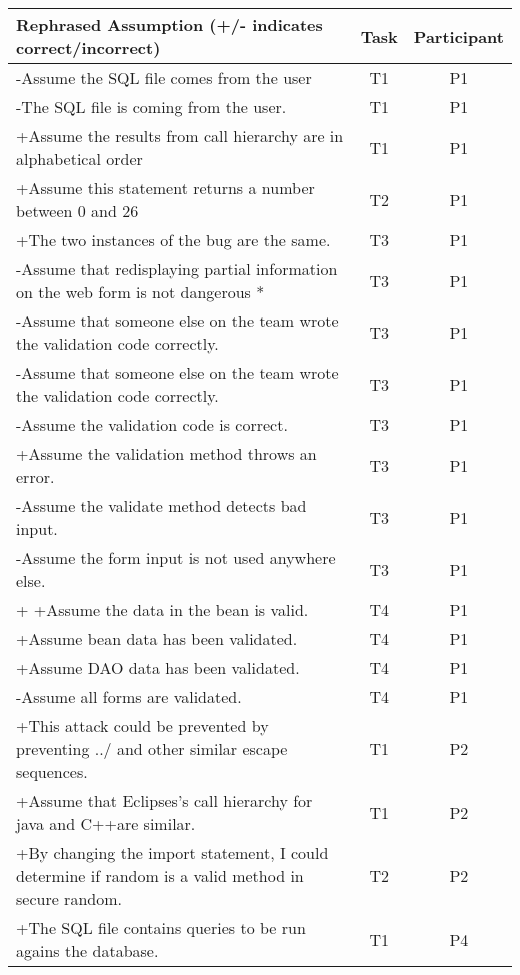 \documentclass[10pt,journal,compsoc]{IEEEtran}
\begin{document}
\begin{table*}
	\centering
	\begin{tabularx}{\textwidth}{|X|c|c|}
		\hline
		Rephrased Assumption (+/- indicates correct/incorrect)	&	Task	&	Participant	\\
		\hline
		-Assume the SQL file comes from the user	&	T1	&	P1	\\
		-The SQL file is coming from the user.	&	T1	&	P1	\\
		+Assume the results from call hierarchy are in alphabetical order	&	T1	&	P1	\\
		+Assume this statement returns a number between 0 and 26 	&	T2	&	P1	\\
		+The two instances of the bug are the same.	&	T3	&	P1	\\
		-Assume that redisplaying partial information on the web form is not dangerous *	&	T3	&	P1	\\
		-Assume that someone else on the team wrote the validation code correctly.	&	T3	&	P1	\\
		-Assume that someone else on the team wrote the validation code correctly.	&	T3	&	P1	\\
		-Assume the validation code is correct.	&	T3	&	P1	\\
		+Assume the validation method throws an error.	&	T3	&	P1	\\
		-Assume the validate method detects bad input.	&	T3	&	P1	\\
		-Assume the form input is not used anywhere else.	&	T3	&	P1	\\
		+%
		+Assume the data in the bean is valid.	&	T4	&	P1	\\
		+Assume bean data has been validated.	&	T4	&	P1	\\
		+Assume DAO data has been validated.	&	T4	&	P1	\\
		-Assume all forms are validated.	&	T4	&	P1	\\
		+This attack could be prevented by preventing ../ and other similar escape sequences.	&	T1	&	P2	\\
		+Assume that Eclipses’s call hierarchy for java and C++are similar.	&	T1	&	P2	\\
		+By changing the import statement, I could determine if random is a valid method in secure random.	&	T2	&	P2	\\
		+The SQL file contains queries to be run agains the database.	&	T1	&	P4	\\

\end{tabularx}
\end{table*}
\end{document}
